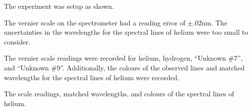 \begin{paper}
The experiment was setup as shown.

The vernier scale on the spectrometer had a reading error of
$\pm.02\si{\nano\meter}$.
The uncertainties in the wavelengths for the spectral lines of helium were
too small to consider.

The vernier scale readings were recorded for helium, hydrogen, ``Unknown \#7'',
and ``Unknown \#9''.
Additionally, the colours of the observed lines and matched wavelengths for the
spectral lines of helium were recorded.\pagebreak

{The scale readings, matched wavelengths, and colours of the spectral lines of helium.}


\end{paper}
